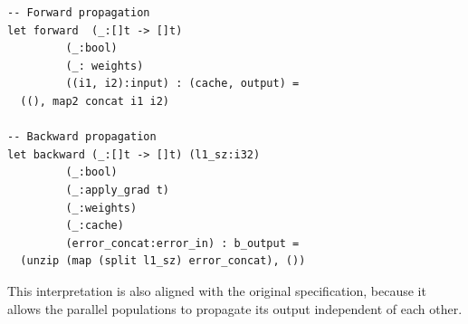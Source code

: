 \lstset{language=,caption=Functions for forward and backward propagation in the merge layer.}
\begin{lstlisting}
-- Forward propagation
let forward  (_:[]t -> []t)
	     (_:bool)
	     (_: weights)
	     ((i1, i2):input) : (cache, output) =
  ((), map2 concat i1 i2)

-- Backward propagation
let backward (_:[]t -> []t) (l1_sz:i32)
	     (_:bool)
	     (_:apply_grad t)
	     (_:weights)
	     (_:cache)
	     (error_concat:error_in) : b_output =
  (unzip (map (split l1_sz) error_concat), ())
\end{lstlisting}

This interpretation is also aligned with the original specification, 
because it allows the parallel populations to propagate its output
independent of each other.

